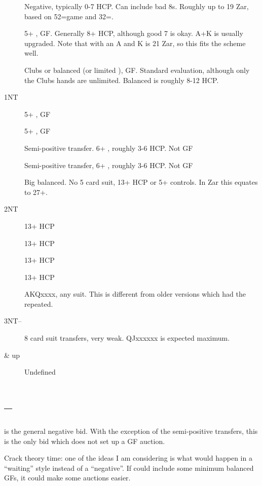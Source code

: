 \documentclass[tom-ari]{subfile}
\begin{document}
	\begin{description}
		\item[] Negative, typically 0-7 HCP.  Can include bad 8s.  Roughly up to 19 Zar, based on 52=game and 32=.
		\item[] 5+ \spadesuit, GF.  Generally 8+ HCP, although good 7 is okay. A+K is usually upgraded.  Note that  with an A and K is 21 Zar, so this fits the scheme well.
		\item[] Clubs or balanced (or limited ), GF.  Standard evaluation, although only the Clubs hands are unlimited.  Balanced is roughly 8-12 HCP.
		\item[1NT] 5+ \heartsuit, GF
		\item[] 5+ \diamondsuit, GF
		\item[] Semi-positive transfer.  6+ \heartsuit, roughly 3-6 HCP.  Not GF
		\item[] Semi-positive transfer, 6+ \spadesuit, roughly 3-6 HCP.  Not GF
		\item[] Big balanced.  No 5 card suit, 13+ HCP or 5+ controls.  In Zar this equates to 27+.
		\item[2NT]  13+ HCP
		\item[]  13+ HCP
		\item[]  13+ HCP
		\item[]  13+ HCP
		\item[]  AKQxxxx, any suit.  This is different from older versions which had the  repeated.
		\item[3NT--] 8 card suit transfers, very weak.  QJxxxxxx is expected maximum.
		\item[ \& up] Undefined
	\end{description}
	
	\section[1C--1D]{--}
	
	 is the general negative bid.  With the exception of the semi-positive transfers, this is the only bid which does not set up a GF auction.
	
	Crack theory time:  one of the ideas I am considering is what would happen in a  ``waiting'' style instead of a ``negative''.  If  could include some minimum balanced GFs, it could make some auctions easier.
	
\end{document}
